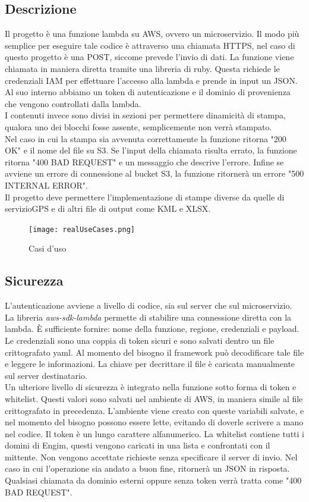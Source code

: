 \documentclass[12pt]{article}
\begin{document}
\subsection{Descrizione}
Il progetto è una funzione lambda su AWS, ovvero un microservizio.
Il modo più semplice per eseguire tale codice è attraverso una chiamata 
HTTPS, nel caso di questo progetto è una POST, siccome prevede l'invio di dati.
La funzione viene chiamata in maniera diretta tramite una libreria di ruby.
Questa richiede le credenziali IAM per effettuare l'accesso alla lambda e prende 
in input un JSON. Al suo interno abbiamo un token di autenticazione e il dominio 
di provenienza che vengono controllati dalla lambda. 
\\ I contenuti invece sono divisi in sezioni per permettere dinamicità di stampa, 
qualora uno dei blocchi fosse assente, semplicemente non verrà stampato. 
\\ Nel caso in cui la stampa sia avvenuta correttamente la funzione ritorna 
"200 OK"
e il nome del file su S3. Se l'input della chiamata risulta errato, la funzione ritorna 
"400 BAD REQUEST"
e un messaggio che descrive l'errore. Infine se avviene un errore di connessione 
al bucket S3, la funzione ritornerà un errore "500 INTERNAL ERROR".    
\\ Il progetto deve permettere l'implementazione di stampe diverse da quelle di servizioGPS
e di altri file di output come KML e XLSX. 

\begin{figure}[H]
\texttt{[image: realUseCases.png]}
\caption{Casi d'uso}
\end{figure}



\subsection{Sicurezza}
L'autenticazione avviene a livello di codice, sia sul server che sul microservizio.
\\ La libreria \textit{aws-sdk-lambda} permette di stabilire una connessione diretta con la 
lambda.
È sufficiente fornire: nome della funzione, regione, credenziali e payload. 
Le credenziali sono una coppia di token sicuri e 
sono salvati dentro un file crittografato yaml. 
Al momento del bisogno il framework può decodificare tale file e 
leggere le informazioni. 
La chiave per decrittare il file è caricata manualmente sul server destinatario.
\\ Un ulteriore livello di sicurezza è integrato nella funzione sotto forma 
di token e whitelist. 
Questi valori sono salvati nel ambiente di AWS, in maniera simile al file 
crittografato in precedenza. 
L'ambiente viene creato con queste variabili salvate, e nel momento del 
bisogno possono essere lette, evitando di doverle scrivere a mano nel codice.
Il token è un lungo carattere alfanumerico.
La whitelist contiene tutti i domini di Engim, questi vengono caricati in 
una lista e confrontati con il mittente. 
Non vengono accettate richieste senza specificare il server di invio.
Nel caso in cui l'operazione sia andato a buon fine, ritornerà un JSON in risposta.
\\ Qualsiasi chiamata da dominio esterni oppure senza token verrà tratta come 
"400 BAD REQUEST". 
\end{document}
